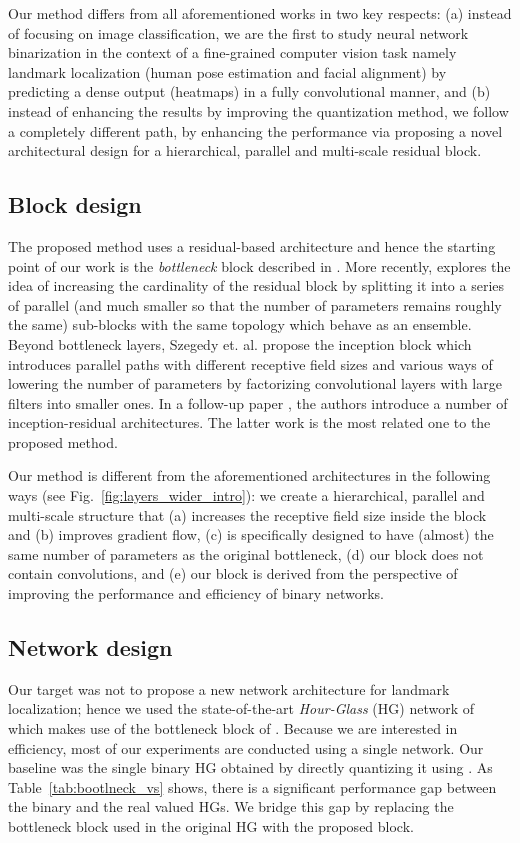 \documentclass[10pt,journal,compsoc]{IEEEtran}
\begin{document}
Our method differs from all aforementioned works in two key respects: (a) instead of focusing on image classification, we are the first to study neural network binarization in the context of a fine-grained computer vision task namely landmark localization (human pose estimation and facial alignment) by predicting a dense output (heatmaps) in a fully convolutional manner, and (b) instead of enhancing the results by improving the quantization method, we follow a completely different path, by enhancing the performance via proposing a novel architectural design for a hierarchical, parallel and multi-scale residual block.

\subsection{Block design} The proposed method uses a residual-based architecture and hence the starting point of our work is the \textit{bottleneck} block described in \cite{he2016deep,he2016identity}. More recently, \cite{xie2016aggregated} explores the idea of increasing the cardinality of the residual block by splitting it into a series of  parallel (and much smaller so that the number of parameters remains roughly the same) sub-blocks with the same topology which behave as an ensemble. Beyond bottleneck layers, Szegedy et. al. \cite{szegedy2015going} propose the inception block which introduces parallel paths with different receptive field sizes and various ways of lowering the number of parameters by factorizing convolutional layers with large filters into smaller ones. In a follow-up paper \cite{szegedy2017inception}, the authors introduce a number of inception-residual architectures. The latter work is the most related one to the proposed method.

Our method is different from the aforementioned architectures in the following ways (see Fig.~\ref{fig:layers_wider_intro}): we create a hierarchical, parallel and multi-scale structure that (a) increases the receptive field size inside the block and (b) improves gradient flow, (c) is specifically designed to have (almost) the same number of parameters as the original bottleneck, (d) our block does not contain  convolutions, and (e) our block is derived from the perspective of improving the performance and efficiency of binary networks.

\subsection{Network design} Our target was not to propose a new network architecture for landmark localization; hence we used the state-of-the-art \textit{Hour-Glass} (HG) network of \cite{newell2016stacked} which makes use of the bottleneck block of \cite{he2016deep}. Because we are interested in efficiency, most of our experiments are conducted using a single network. Our baseline was the single binary HG obtained by directly quantizing it using \cite{rastegari2016xnor}. As Table~\ref{tab:bootlneck_vs} shows, there is a significant performance gap between the binary and the real valued HGs. We bridge this gap by replacing the bottleneck block used in the original HG with the proposed block.
\end{document}
